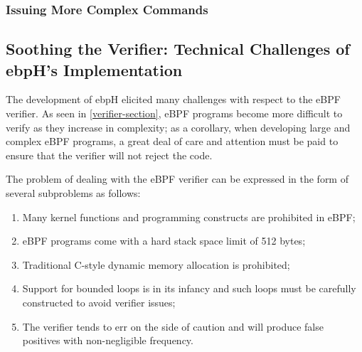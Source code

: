 \documentclass[
  12pt]{findlay}
\providecommand{\tightlist}{\setlength{\itemsep}{0pt}\setlength{\parskip}{0pt}}
\begin{document}
\hypertarget{issuing-more-complex-commands}{%
\subsubsection{Issuing More Complex
Commands}\label{issuing-more-complex-commands}}

\hypertarget{soothing-the-verifier-technical-challenges-of-ebphs-implementation}{%
\subsection{Soothing the Verifier: Technical Challenges of ebpH's
Implementation}\label{soothing-the-verifier-technical-challenges-of-ebphs-implementation}}

The development of ebpH elicited many challenges with respect to the
eBPF verifier. As seen in \autoref{verifier-section}, eBPF programs
become more difficult to verify as they increase in complexity; as a
corollary, when developing large and complex eBPF programs, a great deal
of care and attention must be paid to ensure that the verifier will not
reject the code.

The problem of dealing with the eBPF verifier can be expressed in the
form of several subproblems as follows:

\begin{enumerate}
\def\labelenumi{\arabic{enumi})}
\tightlist
\item
  Many kernel functions and programming constructs are prohibited in
  eBPF;
\item
  eBPF programs come with a hard stack space limit of 512 bytes;
\item
  Traditional C-style dynamic memory allocation is prohibited;
\item
  Support for bounded loops is in its infancy and such loops must be
  carefully constructed to avoid verifier issues;
\item
  The verifier tends to err on the side of caution and will produce
  false positives with non-negligible frequency.
\end{enumerate}
\end{document}
